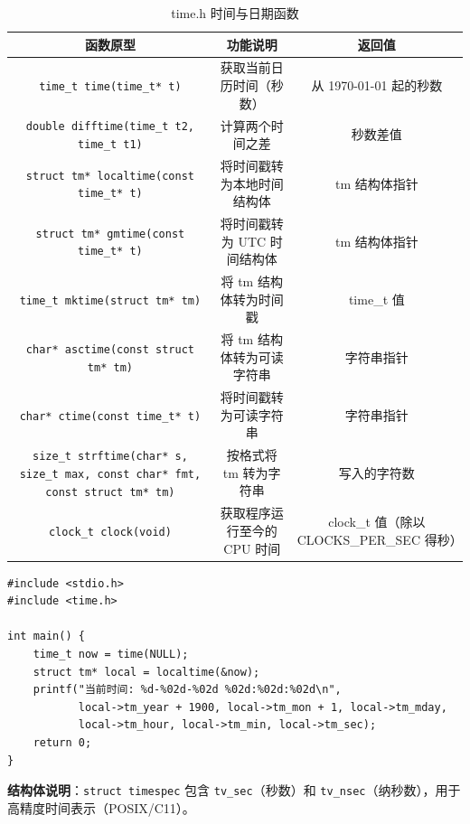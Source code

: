 \begin{table}[H]
\centering
\renewcommand{\arraystretch}{1.6}
\begin{tabulary}{\linewidth}{CCC}
\toprule
\textbf{函数原型} & \textbf{功能说明} & \textbf{返回值} \\ \midrule
\texttt{time\_t time(time\_t* t)} & 获取当前日历时间（秒数） & 从 1970-01-01 起的秒数 \\ 
\texttt{double difftime(time\_t t2, time\_t t1)} & 计算两个时间之差 & 秒数差值 \\ 
\texttt{struct tm* localtime(const time\_t* t)} & 将时间戳转为本地时间结构体 & tm 结构体指针 \\ 
\texttt{struct tm* gmtime(const time\_t* t)} & 将时间戳转为 UTC 时间结构体 & tm 结构体指针 \\ 
\texttt{time\_t mktime(struct tm* tm)} & 将 tm 结构体转为时间戳 & time\_t 值 \\ 
\texttt{char* asctime(const struct tm* tm)} & 将 tm 结构体转为可读字符串 & 字符串指针 \\ 
\texttt{char* ctime(const time\_t* t)} & 将时间戳转为可读字符串 & 字符串指针 \\ 
\texttt{size\_t strftime(char* s, size\_t max, const char* fmt, const struct tm* tm)} & 按格式将 tm 转为字符串 & 写入的字符数 \\ 
\texttt{clock\_t clock(void)} & 获取程序运行至今的 CPU 时间 & clock\_t 值（除以 CLOCKS\_PER\_SEC 得秒） \\ \bottomrule
\end{tabulary}
\caption{time.h 时间与日期函数}
\label{tab:time_funcs}
\end{table}

\noindent\begin{minipage}{\textwidth}
\begin{lstlisting}[caption={time.h 使用示例}]
#include <stdio.h>
#include <time.h>

int main() {
    time_t now = time(NULL);
    struct tm* local = localtime(&now);
    printf("当前时间: %d-%02d-%02d %02d:%02d:%02d\n",
           local->tm_year + 1900, local->tm_mon + 1, local->tm_mday,
           local->tm_hour, local->tm_min, local->tm_sec);
    return 0;
}
\end{lstlisting}
\end{minipage}

\vspace{0.5em}
\begin{sloppypar}
\noindent\textbf{结构体说明}：\texttt{struct timespec} 包含 \texttt{tv\_sec}（秒数）和 \texttt{tv\_nsec}（纳秒数），用于高精度时间表示（POSIX/C11）。
\end{sloppypar}

